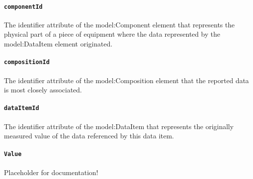 \paragraph{\texttt{componentId}}\mbox{}
\newline\tab The identifier attribute of the {model:Component} element that represents the physical part of a piece of equipment where the data represented by the {model:DataItem} element originated.

\paragraph{\texttt{compositionId}}\mbox{}
\newline\tab The identifier attribute of the {model:Composition} element that the reported data is most closely associated.

\paragraph{\texttt{dataItemId}}\mbox{}
\newline\tab The identifier attribute of the {model:DataItem} that represents the originally measured value of the data referenced by this data item.

\paragraph{\texttt{Value}}\mbox{}
\newline\tab Placeholder for documentation!
\FloatBarrier
